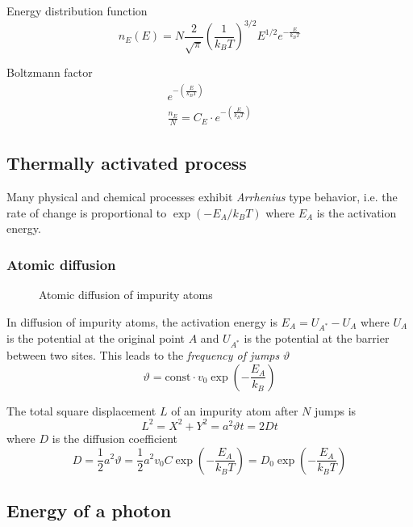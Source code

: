 Energy distribution function
\begin{equation}
    n_E(E) = N \frac{2}{\sqrt{\pi}} \left(\frac{1}{k_B T}\right)^{3/2} E^{1/2} e^{-\frac{E}{k_B T}}
\end{equation}

Boltzmann factor
\begin{align}
	e^{-\left(\frac{E}{k_B T}\right)} \\
	\frac{n_E}{N} = C_E \cdot e^{-\left(\frac{E}{k_B T}\right)}
\end{align}

\subsection{Thermally activated process}
Many physical and chemical processes exhibit \emph{Arrhenius} type behavior, i.e. 
the rate of change is proportional to $\exp(-E_A / k_B T)$ where $E_A$ is the activation energy.

\subsubsection{Atomic diffusion}

\begin{figure}[ht]
    \centering
    
    \caption{Atomic diffusion of impurity atoms}
\end{figure}

In diffusion of impurity atoms, the activation energy is $E_A = U_{A^*} - U_A$ where 
$U_A$ is the potential at the original point $A$ and $U_{A^*}$ is the potential at
the barrier between two sites. This leads to the \emph{frequency of jumps} $\vartheta$
\begin{equation}
    \vartheta = \text{const} \cdot v_0 \exp\left(-\frac{E_A}{k_B}\right)
\end{equation}

The total square displacement $L$ of an impurity atom after $N$ jumps is
\begin{equation}
    L^2 = X^2 + Y^2 = a^2 \vartheta t = 2 D t
\end{equation}
where $D$ is the diffusion coefficient
\begin{equation}
    D = \frac{1}{2} a^2 \vartheta = \frac{1}{2} a^2 v_0 C \exp\left(-\frac{E_A}{k_B T}\right) = D_0 \exp\left(-\frac{E_A}{k_B T}\right)
\end{equation}


\subsection{Energy of a photon}

